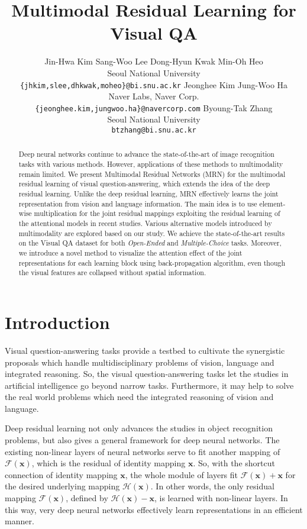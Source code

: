 \documentclass{article}
\title{Multimodal Residual Learning for Visual QA}
\author{Jin-Hwa Kim\hspace{1em}
Sang-Woo Lee\hspace{1em}
Dong-Hyun Kwak\hspace{1em}
Min-Oh Heo
\\Seoul National University\\\texttt{\{jhkim,slee,dhkwak,moheo\}@bi.snu.ac.kr}
\And
Jeonghee Kim\hspace{2em}
Jung-Woo Ha
\\Naver Labs, Naver Corp.\\\texttt{\{jeonghee.kim,jungwoo.ha\}@navercorp.com}
\And
Byoung-Tak Zhang\\Seoul National University\\\texttt{btzhang@bi.snu.ac.kr}}
\newcommand{\vx}[0]{\mathbf{x}}
\begin{document}
\maketitle

\begin{abstract}
  Deep neural networks continue to advance the state-of-the-art of image recognition tasks with various methods. However, applications of these methods to multimodality remain limited. We present Multimodal Residual Networks (MRN) for the multimodal residual learning of visual question-answering, which extends the idea of the deep residual learning. Unlike the deep residual learning, MRN effectively learns the joint representation from vision and language information. The main idea is to use element-wise multiplication for the joint residual mappings exploiting the residual learning of the attentional models in recent studies. Various alternative models introduced by multimodality are explored based on our study. We achieve the state-of-the-art results on the Visual QA dataset for both \textit{Open-Ended} and \textit{Multiple-Choice} tasks. Moreover, we introduce a novel method to visualize the attention effect of the joint representations for each learning block using back-propagation algorithm, even though the visual features are collapsed without spatial information.
\end{abstract}

\section{Introduction}


Visual question-answering tasks provide a testbed to cultivate the synergistic proposals which handle multidisciplinary problems of vision, language and integrated reasoning. So, the visual question-answering tasks let the studies in artificial intelligence go beyond narrow tasks. Furthermore, it may help to solve the real world problems which need the integrated reasoning of vision and language.

Deep residual learning \cite{He2015} not only advances the studies in object recognition problems, but also gives a general framework for deep neural networks. The existing non-linear layers of neural networks serve to fit another mapping of $\mathcal{F}(\vx)$, which is the residual of identity mapping $\vx$. So, with the shortcut connection of identity mapping $\vx$, the whole module of layers fit $\mathcal{F}(\vx) + \vx$ for the desired underlying mapping $\mathcal{H}(\vx)$. In other words, the only residual mapping $\mathcal{F}(\vx)$, defined by $\mathcal{H}(\vx) - \vx$, is learned with non-linear layers. In this way, very deep neural networks effectively learn representations in an efficient manner. 
\end{document}
